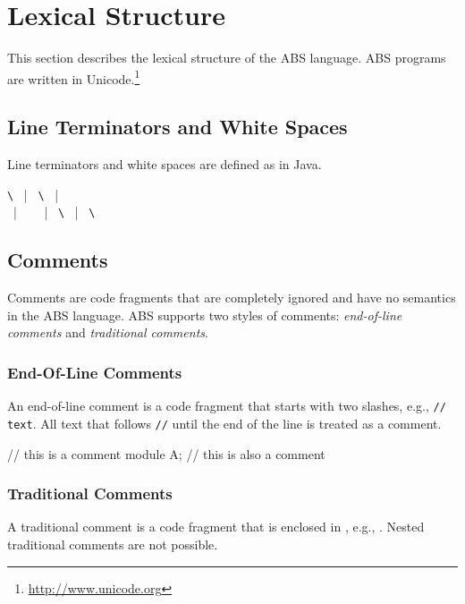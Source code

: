 \chapter{Lexical Structure}
\label{ch:lexical structure}
This section describes the lexical structure of the ABS language.
ABS programs are written in Unicode.\footnote{\url{http://www.unicode.org}}

\section{Line Terminators and White Spaces}
Line terminators and white spaces are defined as in Java.
%
\begin{abssyntax}
\concrDefn{} \verb_\_  ~|~ \verb_\_ ~|~  
\\
 \concrDefn{}
   ~|~ \verb*_ _ ~|~ \verb_\_ ~|~ \verb_\_
\end{abssyntax}

\section{Comments}
Comments are code fragments that are completely ignored and have no semantics in the ABS language.
ABS supports two styles of comments:
\emph{end-of-line comments} and \emph{traditional comments}.

\subsection{End-Of-Line Comments}
An end-of-line comment is a code fragment that starts with two slashes, e.g., \verb_// text_. All text that follows \verb_//_ until the end of the line is treated as a comment.

\begin{absexample}
// this is a comment
module A; // this is also a comment
\end{absexample}

\subsection{Traditional Comments}
A traditional comment is a code fragment that is enclosed in \absinline{/* */}, e.g., .
Nested traditional comments are not possible.

